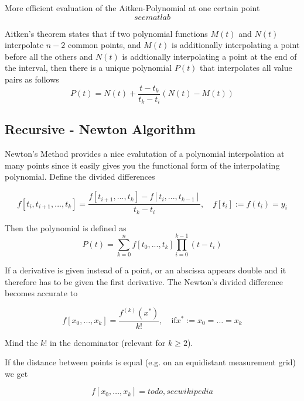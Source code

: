 \documentclass[
    a4paper,
    11pt
]{article}
\begin{document}
More efficient evaluation of the Aitken-Polynomial at one certain point
\begin{equation}
    see matlab
\end{equation}

Aitken's theorem states that if two polynomial functions $M(t)$ and $N(t)$
interpolate $n-2$ common points, and $M(t)$ is additionally interpolating a
point before all the others and $N(t)$ is addtionally interpolating a point at
the end of the interval, then there is a unique polynomial $P(t)$ that
interpolates all value pairs as follows
\begin{equation}
    P(t) = N(t) + \frac{t - t_k}{t_k - t_i} (N(t) - M(t))
\end{equation}

\subsection{Recursive - Newton Algorithm}

Newton's Method provides a nice evalutation of a polynomial interpolation at
many points since it easily gives you the functional form of the interpolating
polynomial. Define the divided differences

\begin{equation}
    f[t_i, t_{i+1}, ..., t_k] =
    \frac{f[t_{i+1}, ..., t_k] - f[t_i, ..., t_{k-1}]}{t_k - t_i},
    \quad
    f[t_i] := f(t_i) = y_i
\end{equation}

Then the polynomial is defined as
\begin{equation}
    P(t) = \sum_{k=0}^{n} f[t_0, ..., t_k] \prod_{i=0}^{k-1}(t - t_i)
\end{equation}

If a derivative is given instead of a point, or an abscissa appears double and
it therefore has to be given the first derivative. The Newton's divided
difference becomes accurate to

\begin{equation}
    f[x_0, \dots, x_k] = \frac{f^{(k)}(x^*)}{k!}, \quad \text{if} x^* := x_0 =
    \dots = x_k
\end{equation}

Mind the $k!$ in the denominator (relevant for $k \geq 2$).

If the distance between points is equal (e.g. on an equidistant measurement
grid) we get

\begin{equation}
    f[x_0, \dots, x_k] = todo, see wikipedia
\end{equation}
\end{document}

